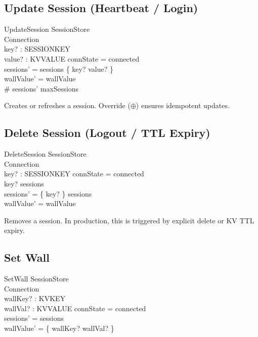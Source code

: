 \documentclass[a4paper,10pt,fleqn]{article}
\begin{document}
\subsection{Update Session (Heartbeat / Login)}

\begin{schema}{UpdateSession}
  \Delta SessionStore \\
  \Xi Connection \\
  key? : SESSIONKEY \\
  value? : KVVALUE
  \where
  connState = connected \\
  sessions' = sessions \oplus \{ key? \mapsto value? \} \\
  wallValue' = wallValue \\
  \# sessions' \leq maxSessions
\end{schema}

Creates or refreshes a session.  Override ($\oplus$) ensures
idempotent updates.

\subsection{Delete Session (Logout / TTL Expiry)}

\begin{schema}{DeleteSession}
  \Delta SessionStore \\
  \Xi Connection \\
  key? : SESSIONKEY
  \where
  connState = connected \\
  key? \in \dom sessions \\
  sessions' = \{ key? \} \ndres sessions \\
  wallValue' = wallValue
\end{schema}

Removes a session.  In production, this is triggered by
explicit delete or KV TTL expiry.

\subsection{Set Wall}

\begin{schema}{SetWall}
  \Delta SessionStore \\
  \Xi Connection \\
  wallKey? : KVKEY \\
  wallVal? : KVVALUE
  \where
  connState = connected \\
  sessions' = sessions \\
  wallValue' = \{ wallKey? \mapsto wallVal? \}
\end{schema}
\end{document}
